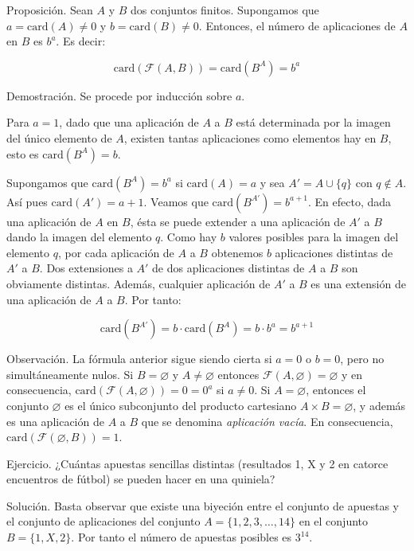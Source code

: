 Proposición. Sean $A$ y $B$ dos conjuntos finitos. Supongamos que $a =
\text{card}(A) \neq 0$ y $b = \text{card}(B) \neq 0$. Entonces, el número de
aplicaciones de $A$ en $B$ es $b^a$. Es decir:

$$ \text{card} \left( \mathcal{F}(A,B) \right) = \text{card} \left( B^A
\right) = b^a $$

Demostración. Se procede por inducción sobre $a$.

Para $a = 1$, dado que una aplicación de $A$ a $B$ está determinada por la
imagen del único elemento de $A$, existen tantas aplicaciones como elementos
hay en $B$, esto es $\text{card}(B^A) = b$.

Supongamos que $\text{card}(B^A) = b^a$ si $\text{card}(A) = a$ y sea $A' =
A \cup \{q\}$ con $q \notin A$. Así pues $\text{card}(A') = a + 1$. Veamos
que $\text{card}(B^{A'}) = b^{a+1}$. En efecto, dada una aplicación de $A$
en $B$, ésta se puede extender a una aplicación de $A'$ a $B$ dando la
imagen del elemento $q$. Como hay $b$ valores posibles para la imagen del
elemento $q$, por cada aplicación de $A$ a $B$ obtenemos $b$ aplicaciones
distintas de $A'$ a $B$. Dos extensiones a $A'$ de dos aplicaciones
distintas de $A$ a $B$ son obviamente distintas. Además, cualquier
aplicación de $A'$ a $B$ es una extensión de una aplicación de $A$ a $B$.
Por tanto:

$$ \text{card}(B^{A'}) = b \cdot \text{card}(B^A) = b \cdot b^a = b^{a+1} $$

Observación. La fórmula anterior sigue siendo cierta si $a = 0$ o $b = 0$,
pero no simultáneamente nulos. Si $B = \varnothing$ y $A \neq \varnothing$
entonces $\mathcal{F}(A, \varnothing) = \varnothing$ y en consecuencia,
$\text{card} \left( \mathcal{F}(A, \varnothing) \right) = 0 = 0^a$ si $a
\neq 0$. Si $A = \varnothing$, entonces el conjunto $\varnothing$ es el
único subconjunto del producto cartesiano $A \times B = \varnothing$, y
además es una aplicación de $A$ a $B$ que se denomina \textit{aplicación
vacía}. En consecuencia, $\text{card} \left( \mathcal{F}(\varnothing, B)
\right) = 1$.

Ejercicio. ¿Cuántas apuestas sencillas distintas (resultados 1, X y 2 en
catorce encuentros de fútbol) se pueden hacer en una quiniela?

Solución. Basta observar que existe una biyeción entre el conjunto de
apuestas y el conjunto de aplicaciones del conjunto $A = \{1,2,3,\dots,14\}$
en el conjunto $B = \{1, X, 2\}$. Por tanto el número de apuestas posibles
es $3^{14}$.

